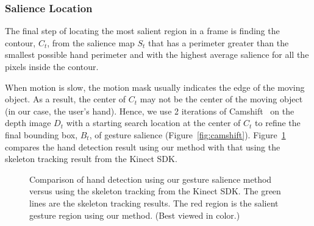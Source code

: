\documentclass{acm_proc_article-sp}
\begin{document}
\subsubsection{Salience Location}
The final step of locating the most salient region in a frame is finding the
contour, $C_t$, from the salience map $S_t$ that has a perimeter greater than
the smallest possible hand perimeter and with the highest average salience for all the pixels inside the contour.

When motion is slow, the motion mask usually indicates the edge of the moving
object. As a result, the center of $C_t$ may not be the center of the moving
object (in our case, the user's hand). Hence, we use 2 iterations of Camshift~\cite{Bradski98} on 
the depth image $D_t$ with a starting search location at the center of $C_t$ to refine
the final bounding box, $B_t$, of gesture salience (Figure~\ref{fig:camshift}). Figure~\ref{fig:compare-skeleton} compares the hand detection result using our method with that using the skeleton tracking result
from the Kinect SDK.
\begin{figure}
\centering
{}
\caption{Comparison of hand detection using our gesture salience method versus using the skeleton tracking from the Kinect SDK. The green lines are
the skeleton tracking results. The red region is the salient gesture
region using our method. (Best viewed in color.)}
\label{fig:compare-skeleton}
\end{figure}
\end{document}
